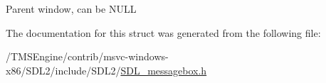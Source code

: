 Parent window, can be N\+U\+LL 

The documentation for this struct was generated from the following file\+:\begin{DoxyCompactItemize}
\item 
/\+T\+M\+S\+Engine/contrib/msvc-\/windows-\/x86/\+S\+D\+L2/include/\+S\+D\+L2/\hyperlink{_s_d_l__messagebox_8h}{S\+D\+L\+\_\+messagebox.\+h}\end{DoxyCompactItemize}
